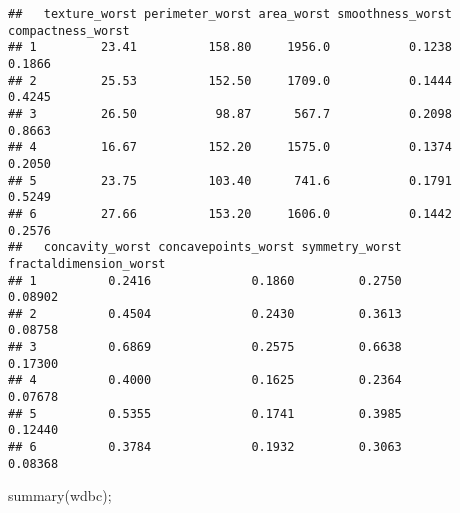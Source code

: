 \documentclass[
]{article}
\newenvironment{Shaded}{\begin{snugshade}}{\end{snugshade}}
\newcommand{\FunctionTok}[1]{\textcolor[rgb]{0.00,0.00,0.00}{#1}}
\newcommand{\NormalTok}[1]{#1}
\begin{document}
\begin{verbatim}
##   texture_worst perimeter_worst area_worst smoothness_worst compactness_worst
## 1         23.41          158.80     1956.0           0.1238            0.1866
## 2         25.53          152.50     1709.0           0.1444            0.4245
## 3         26.50           98.87      567.7           0.2098            0.8663
## 4         16.67          152.20     1575.0           0.1374            0.2050
## 5         23.75          103.40      741.6           0.1791            0.5249
## 6         27.66          153.20     1606.0           0.1442            0.2576
##   concavity_worst concavepoints_worst symmetry_worst fractaldimension_worst
## 1          0.2416              0.1860         0.2750                0.08902
## 2          0.4504              0.2430         0.3613                0.08758
## 3          0.6869              0.2575         0.6638                0.17300
## 4          0.4000              0.1625         0.2364                0.07678
## 5          0.5355              0.1741         0.3985                0.12440
## 6          0.3784              0.1932         0.3063                0.08368
\end{verbatim}

\begin{Shaded}
\begin{Highlighting}[]
\FunctionTok{summary}\NormalTok{(wdbc);}
\end{Highlighting}
\end{Shaded}
\end{document}
